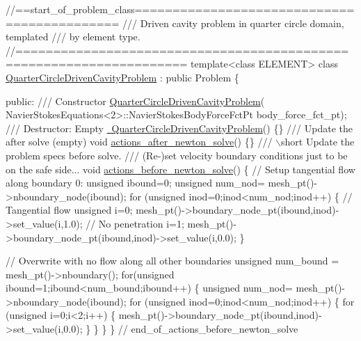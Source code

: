  
\begin{DoxyCodeInclude}
\textcolor{comment}{//==start\_of\_problem\_class============================================}
\textcolor{comment}{/// Driven cavity problem in quarter circle domain, templated}
\textcolor{comment}{}\textcolor{comment}{/// by element type. }
\textcolor{comment}{}\textcolor{comment}{//====================================================================}
\textcolor{keyword}{template}<\textcolor{keyword}{class} ELEMENT>
\textcolor{keyword}{class }\hyperlink{classQuarterCircleDrivenCavityProblem}{QuarterCircleDrivenCavityProblem} : \textcolor{keyword}{public} Problem
\{

\textcolor{keyword}{public}:
\textcolor{comment}{}
\textcolor{comment}{ /// Constructor}
\textcolor{comment}{} \hyperlink{classQuarterCircleDrivenCavityProblem_ae5fd69acf7d28a600cb6aa0bbb6a341c}{QuarterCircleDrivenCavityProblem}(
  NavierStokesEquations<2>::NavierStokesBodyForceFctPt body\_force\_fct\_pt);
\textcolor{comment}{}
\textcolor{comment}{ /// Destructor: Empty}
\textcolor{comment}{} \hyperlink{classQuarterCircleDrivenCavityProblem_a07410fd9d1194613f92dd6620fa3207a}{~QuarterCircleDrivenCavityProblem}() \{\}
\textcolor{comment}{}
\textcolor{comment}{ /// Update the after solve (empty)}
\textcolor{comment}{} \textcolor{keywordtype}{void} \hyperlink{classQuarterCircleDrivenCavityProblem_ad2ed0b3e89e1cd0e28cc61ae4fd129bc}{actions\_after\_newton\_solve}() \{\}
\textcolor{comment}{}
\textcolor{comment}{ /// \(\backslash\)short Update the problem specs before solve. }
\textcolor{comment}{ /// (Re-)set velocity boundary conditions just to be on the safe side...}
\textcolor{comment}{} \textcolor{keywordtype}{void} \hyperlink{classQuarterCircleDrivenCavityProblem_aa1d9cfd27fc1abe2a85e756009781547}{actions\_before\_newton\_solve}()
  \{ 
  \textcolor{comment}{// Setup tangential flow along boundary 0:}
  \textcolor{keywordtype}{unsigned} ibound=0; 
  \textcolor{keywordtype}{unsigned} num\_nod= mesh\_pt()->nboundary\_node(ibound);
  \textcolor{keywordflow}{for} (\textcolor{keywordtype}{unsigned} inod=0;inod<num\_nod;inod++)
   \{
    \textcolor{comment}{// Tangential flow}
    \textcolor{keywordtype}{unsigned} i=0;
    mesh\_pt()->boundary\_node\_pt(ibound,inod)->set\_value(i,1.0);
    \textcolor{comment}{// No penetration}
    i=1;
    mesh\_pt()->boundary\_node\_pt(ibound,inod)->set\_value(i,0.0);
   \}
  
  \textcolor{comment}{// Overwrite with no flow along all other boundaries}
  \textcolor{keywordtype}{unsigned} num\_bound = mesh\_pt()->nboundary();
  \textcolor{keywordflow}{for}(\textcolor{keywordtype}{unsigned} ibound=1;ibound<num\_bound;ibound++)
   \{
    \textcolor{keywordtype}{unsigned} num\_nod= mesh\_pt()->nboundary\_node(ibound);
    \textcolor{keywordflow}{for} (\textcolor{keywordtype}{unsigned} inod=0;inod<num\_nod;inod++)
     \{
      \textcolor{keywordflow}{for} (\textcolor{keywordtype}{unsigned} i=0;i<2;i++)
       \{
        mesh\_pt()->boundary\_node\_pt(ibound,inod)->set\_value(i,0.0);
       \}
     \}
   \}
  \} \textcolor{comment}{// end\_of\_actions\_before\_newton\_solve}


\end{DoxyCodeInclude}
